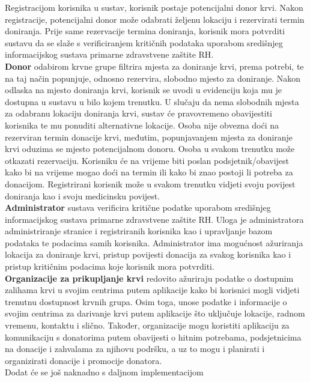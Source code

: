     		Registracijom korisnika u sustav, korisnik postaje potencijalni donor krvi. Nakon registracije, potencijalni donor može odabrati željenu lokaciju i rezervirati termin doniranja. Prije same rezervacije termina doniranja, korisnik mora potvrditi sustavu da se slaže s verificiranjem kritičnih podataka uporabom središnjeg informacijskog sustava primarne zdravstvene zaštite RH.\\
            \textbf{Donor} odabirom krvne grupe filtrira mjesta za doniranje krvi, prema potrebi, te na taj način popunjuje, odnosno rezervira, slobodno mjesto za doniranje. Nakon odlaska na mjesto doniranja krvi, korisnik se uvodi u evidenciju koja mu je dostupna u sustavu u bilo kojem trenutku. U slučaju da nema slobodnih mjesta za odabranu lokaciju doniranja krvi, sustav će pravovremeno obavijestiti korisnika te mu ponuditi alternativne lokacije. Osoba nije obvezna doći na rezerviran termin donacije krvi, međutim, popunjavanjem mjesta za doniranje krvi oduzima se mjesto potencijalnom donoru. Osoba u svakom trenutku može otkazati rezervaciju. Korisniku će na vrijeme biti poslan podsjetnik/obavijest kako bi na vrijeme mogao doći na termin ili kako bi znao postoji li potreba za donacijom. Registrirani korisnik može u svakom trenutku vidjeti svoju povijest doniranja kao i svoju medicinsku povijest.\\
            \textbf{Administrator} sustava verificira kritične podatke uporabom središnjeg informacijskog sustava primarne zdravstvene zaštite RH. Uloga je administratora administriranje stranice i registriranih korisnika kao i upravljanje bazom podataka te podacima samih korisnika. Administrator ima mogućnost ažuriranja lokacija za doniranje krvi, pristup povijesti donacija za svakog korisnika kao i pristup kritičnim podacima koje korisnik mora potvrditi. \\
            \textbf{Organizacije za prikupljanje krvi} redovito ažuriraju podatke o dostupnim zalihama krvi u svojim centrima putem aplikacije kako bi korisnici mogli vidjeti trenutnu dostupnost krvnih grupa. Osim toga, unose podatke i informacije o svojim centrima za darivanje krvi putem aplikacije što uključuje lokacije, radnom vremenu, kontaktu i slično. Također, organizacije mogu koristiti aplikaciju za komunikaciju s donatorima putem obavijesti o hitnim potrebama, podsjetnicima na donacije i zahvalama za njihovu podršku, a uz to mogu i planirati i organizirati donacije i promocije donatora.\\


            Dodat će se još naknadno s daljnom implementacijom
		\eject
		
